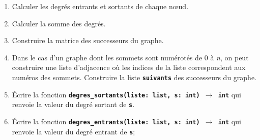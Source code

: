 \documentclass[a4paper,11pt]{article}
\begin{document}
\begin{exo}
    \begin{center}
    \end{center}
    \begin{enumerate}
        \item Calculer les degrés entrants et sortants de chaque nœud.
        \item Calculer la somme des degrés.
        \item Construire la matrice des successeurs du graphe.
        \item Dans le cas d'un graphe dont les sommets sont numérotés de 0 à \emph{n}, on peut construire une liste d'adjacence où les indices de la liste correspondent aux numéros des sommets. Construire la liste \textbf{\texttt{suivants}} des successeurs du graphe.
        \item Écrire la fonction \textbf{\texttt{degres\_sortants(liste: list, s: int) $\rightarrow$ int}} qui renvoie la valeur du degré sortant de \textbf{\texttt{s}}.
        \item Écrire la fonction \textbf{\texttt{degres\_entrants(liste: list, s: int) $\rightarrow$ int}} qui renvoie la valeur du degré entrant de \textbf{\texttt{s}};
    \end{enumerate}
\end{exo}
\end{document}
